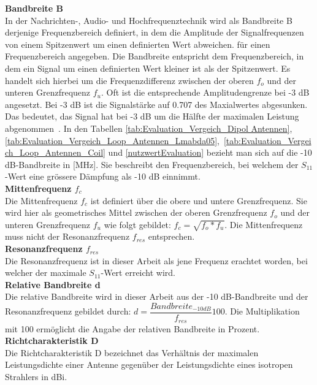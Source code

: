 \textbf{Bandbreite B}\\
In der Nachrichten-, Audio- und Hochfrequenztechnik wird  als Bandbreite B derjenige Frequenzbereich definiert, in dem die Amplitude der Signalfrequenzen von einem Spitzenwert um einen definierten Wert abweichen. für einen Frequenzbereich angegeben. Die Bandbreite entspricht dem Frequenzbereich, in dem ein Signal um einen definierten Wert kleiner ist als der Spitzenwert. Es handelt sich hierbei um die Frequenzdifferenz zwischen der oberen $f_o$ und der unteren Grenzfrequenz $f_u$. Oft ist die entsprechende Amplitudengrenze bei -3 dB angesetzt. Bei -3 dB ist die Signalstärke auf 0.707 des Maxialwertes abgesunken. Das bedeutet, das Signal hat bei -3 dB um die Hälfte der maximalen Leistung abgenommen\  \cite{Bandbreite_B}.
In den Tabellen \ref{tab:Evaluation_Vergeich_Dipol Antennen}, \ref{tab:Evaluation_Vergeich_Loop_Antennen_Lmabda05},\  \ref{tab:Evaluation_Vergeich_Loop_Antennen_Coil} und \ref{nutzwertEvaluation} bezieht man sich auf die -10 dB-Bandbreite in [MHz]. Sie beschreibt den Frequenzbereich, bei welchem der $S_{11}$-Wert eine grössere Dämpfung als -10 dB einnimmt.\\

\textbf{Mittenfrequenz $f_{c}$}\\
Die Mittenfrequenz $f_c$ ist definiert über die obere und untere Grenzfrequenz. Sie wird hier als geometrisches Mittel zwischen der oberen Grenzfrequenz $f_o$ und der unteren Grenzfrequenz $f_u$ wie folgt gebildet: $f_c=\sqrt{f_o*f_u}$. Die Mittenfrequenz muss nicht der Resonanzfrequenz $f_{res}$ entsprechen.\\

\textbf{Resonanzfrequenz $f_{res}$}\\
Die Resonanzfrequenz ist in dieser Arbeit als jene Frequenz erachtet worden, bei welcher der maximale $S_{11}$-Wert erreicht wird.\\

\textbf{Relative Bandbreite d}\\
Die relative Bandbreite wird in dieser Arbeit aus der -10 dB-Bandbreite und der  
Resonanzfrequenz gebildet durch: $d=\dfrac{Bandbreite_{-10dB}}{f_{res}}100$. Die Multiplikation mit 100 ermöglicht die Angabe der relativen Bandbreite in Prozent. \\

\textbf{Richtcharakteristik D}\\
Die Richtcharakteristik D bezeichnet das Verhältnis der maximalen Leistungsdichte einer Antenne gegenüber der Leistungsdichte eines isotropen Strahlers in dBi.\\

